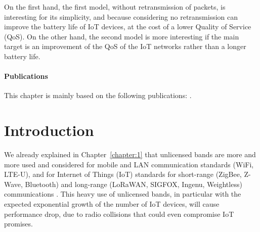 On the first hand, the first model, without retransmission of packets, is interesting for its simplicity, and because considering no retransmission can improve the battery life of IoT devices, at the cost of a lower Quality of Service (QoS).
On the other hand, the second model is more interesting if the main target is an improvement of the QoS of the IoT networks rather than a longer battery life.


\vfill{}

\paragraph{Publications}

This chapter is mainly based on the following publications: \cite{Bonnefoi17,Besson2018ICT,Besson2019WCNC,Bonnefoi2019WCNC}.

\newpage
\graphicspath{{2-Chapters/4-Chapter/Images/}}


\section{Introduction}
\label{sec:4:motivations}

We already explained in Chapter~\ref{chapter:1} that
unlicensed bands are more and more used and considered for mobile and LAN communication standards (WiFi, LTE-U), and for Internet of Things (IoT) standards for short-range (ZigBee, Z-Wave, Bluetooth) and long-range (LoRaWAN, SIGFOX, Ingenu, Weightless) communications \cite{Centenaro16}.
This heavy use of unlicensed bands, in particular with the expected exponential growth of the number of IoT devices, will cause performance drop, due to radio collisions that could even compromise IoT promises.

